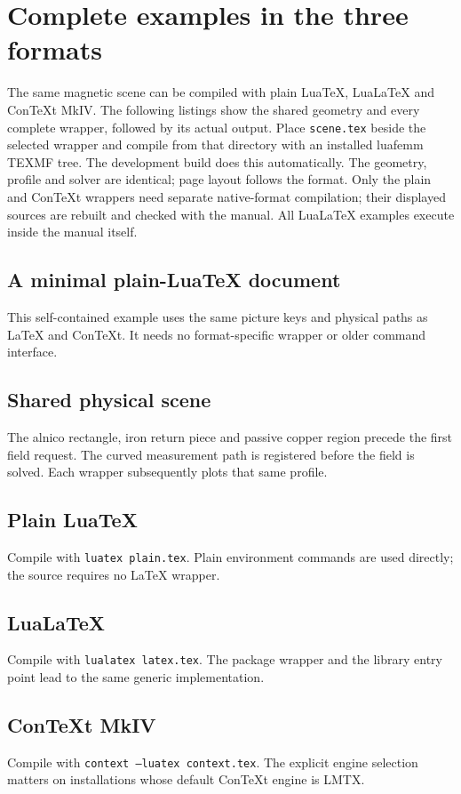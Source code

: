 \section{Complete examples in the three formats}
\label{sec:format-examples}
The same magnetic scene can be compiled with plain LuaTeX, LuaLaTeX and
ConTeXt MkIV. The following listings show the shared geometry and every
complete wrapper, followed by its actual output. Place \texttt{scene.tex}
beside the selected wrapper and compile from that directory with an
installed luafemm TEXMF tree. The development build does this automatically.
The geometry, profile and solver are identical; page layout follows the format.
Only the plain and ConTeXt wrappers need separate native-format compilation;
their displayed sources are rebuilt and checked with the manual. All LuaLaTeX
examples execute inside the manual itself.

\subsection{A minimal plain-LuaTeX document}
This self-contained example uses the same picture keys and physical paths as
LaTeX and ConTeXt. It needs no format-specific wrapper or older command interface.

\subsection{Shared physical scene}
The alnico rectangle, iron return piece and passive copper region precede
the first field request. The curved measurement path is registered before
the field is solved. Each wrapper subsequently plots that same profile.

\subsection{Plain LuaTeX}
Compile with \texttt{luatex plain.tex}. Plain environment commands are
used directly; the source requires no LaTeX wrapper.

\subsection{LuaLaTeX}
Compile with \texttt{lualatex latex.tex}. The package wrapper and the
library entry point lead to the same generic implementation.

\subsection{ConTeXt MkIV}
Compile with \texttt{context --luatex context.tex}. The explicit engine
selection matters on installations whose default ConTeXt engine is LMTX.
